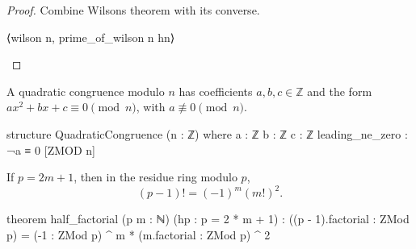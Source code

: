 \begin{proof}
  Combine Wilson\textquotesingle s theorem with its converse.

  \begin{lean}
    ⟨wilson n, prime_of_wilson n hn⟩
  \end{lean}
\end{proof}

\begin{definition}
  A quadratic congruence modulo $n$ has coefficients $a,b,c\in\mathbb Z$ and the form
  $ax^2+bx+c\equiv0\pmod n$, with $a\not\equiv0\pmod n$.

  \begin{lean}
    structure QuadraticCongruence (n : ℤ) where
      a : ℤ
      b : ℤ
      c : ℤ
      leading_ne_zero : ¬a ≡ 0 [ZMOD n]
  \end{lean}
\end{definition}

\begin{theorem}
  \label{ent:thm:half-factorial}
  If $p=2m+1$, then in the residue ring modulo $p$, \[ (p-1)!=(-1)^m(m!)^2. \]

  \begin{lean}
    theorem half_factorial (p m : ℕ) (hp : p = 2 * m + 1) :
        ((p - 1).factorial : ZMod p) = (-1 : ZMod p) ^ m * (m.factorial : ZMod p) ^ 2
  \end{lean}
\end{theorem}

